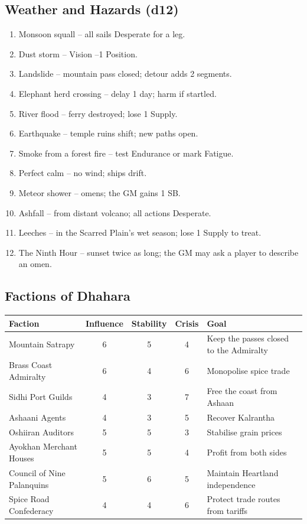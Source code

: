 \documentclass[11pt]{book}
\begin{document}
\subsection{Weather and Hazards (d12)}
\begin{enumerate}
    \item Monsoon squall -- all sails Desperate for a leg.
    \item Dust storm -- Vision --1 Position.
    \item Landslide -- mountain pass closed; detour adds 2 segments.
    \item Elephant herd crossing -- delay 1 day; harm if startled.
    \item River flood -- ferry destroyed; lose 1 Supply.
    \item Earthquake -- temple ruins shift; new paths open.
    \item Smoke from a forest fire -- test Endurance or mark Fatigue.
    \item Perfect calm -- no wind; ships drift.
    \item Meteor shower -- omens; the GM gains 1 SB.
    \item Ashfall -- from distant volcano; all actions Desperate.
    \item Leeches -- in the Scarred Plain's wet season; lose 1 Supply to treat.
    \item The Ninth Hour -- sunset twice as long; the GM may ask a player to describe an omen.
\end{enumerate}

\subsection{Factions of Dhahara}
\begin{tabu} to \linewidth {|X|c|c|c|X|}
\hline
\textbf{Faction} & \textbf{Influence} & \textbf{Stability} & \textbf{Crisis} & \textbf{Goal} \\
\hline
Mountain Satrapy & 6 & 5 & 4 & Keep the passes closed to the Admiralty \\
Brass Coast Admiralty & 6 & 4 & 6 & Monopolise spice trade \\
Sidhi Port Guilds & 4 & 3 & 7 & Free the coast from Ashaan \\
Ashaani Agents & 4 & 3 & 5 & Recover Kalrantha \\
Oshiiran Auditors & 5 & 5 & 3 & Stabilise grain prices \\
Ayokhan Merchant Houses & 5 & 5 & 4 & Profit from both sides \\
Council of Nine Palanquins & 5 & 6 & 5 & Maintain Heartland independence \\
Spice Road Confederacy & 4 & 4 & 6 & Protect trade routes from tariffs \\
\hline
\end{tabu}
\end{document}
